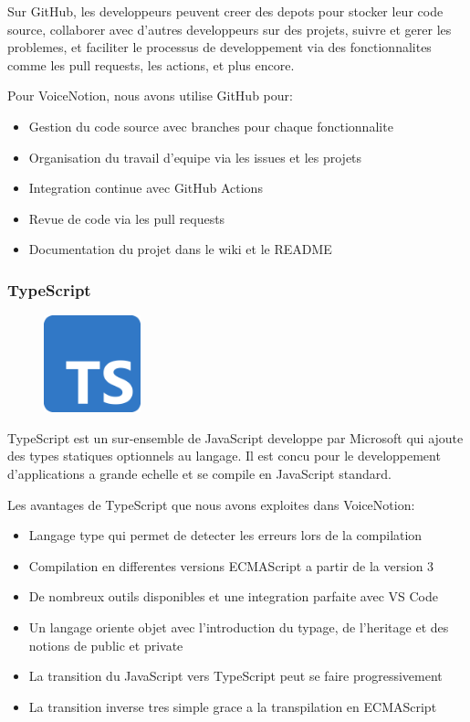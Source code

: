 Sur GitHub, les developpeurs peuvent creer des depots pour stocker leur code source, collaborer avec d'autres developpeurs sur des projets, suivre et gerer les problemes, et faciliter le processus de developpement via des fonctionnalites comme les pull requests, les actions, et plus encore.

Pour VoiceNotion, nous avons utilise GitHub pour:
\begin{itemize}
    \item Gestion du code source avec branches pour chaque fonctionnalite
    \item Organisation du travail d'equipe via les issues et les projets
    \item Integration continue avec GitHub Actions
    \item Revue de code via les pull requests
    \item Documentation du projet dans le wiki et le README
\end{itemize}

\subsubsection{TypeScript}
\begin{figure}
    \centering
    \includegraphics[width=0.25\textwidth]{assets/docs/typescript.png}
\end{figure}
TypeScript est un sur-ensemble de JavaScript developpe par Microsoft qui ajoute des types statiques optionnels au langage. Il est concu pour le developpement d'applications a grande echelle et se compile en JavaScript standard.

Les avantages de TypeScript que nous avons exploites dans VoiceNotion:
\begin{itemize}
    \item Langage type qui permet de detecter les erreurs lors de la compilation
    \item Compilation en differentes versions ECMAScript a partir de la version 3
    \item De nombreux outils disponibles et une integration parfaite avec VS Code
    \item Un langage oriente objet avec l'introduction du typage, de l'heritage et des notions de public et private
    \item La transition du JavaScript vers TypeScript peut se faire progressivement
    \item La transition inverse tres simple grace a la transpilation en ECMAScript
\end{itemize}

